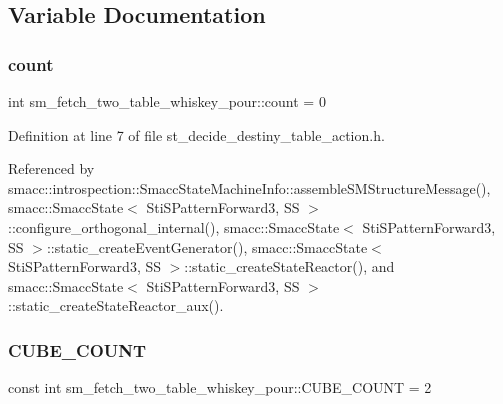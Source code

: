 \subsection{Variable Documentation}
\mbox{\label{namespacesm__fetch__two__table__whiskey__pour_acbce06cd0c9048e8be6a258e2c406986}} 
\subsubsection{\texorpdfstring{count}{count}}
{\footnotesize\ttfamily int sm\+\_\+fetch\+\_\+two\+\_\+table\+\_\+whiskey\+\_\+pour\+::count = 0\hspace{0.3cm}{\ttfamily [static]}}



Definition at line 7 of file st\+\_\+decide\+\_\+destiny\+\_\+table\+\_\+action.\+h.



Referenced by smacc\+::introspection\+::\+Smacc\+State\+Machine\+Info\+::assemble\+S\+M\+Structure\+Message(), smacc\+::\+Smacc\+State$<$ Sti\+S\+Pattern\+Forward3, S\+S $>$\+::configure\+\_\+orthogonal\+\_\+internal(), smacc\+::\+Smacc\+State$<$ Sti\+S\+Pattern\+Forward3, S\+S $>$\+::static\+\_\+create\+Event\+Generator(), smacc\+::\+Smacc\+State$<$ Sti\+S\+Pattern\+Forward3, S\+S $>$\+::static\+\_\+create\+State\+Reactor(), and smacc\+::\+Smacc\+State$<$ Sti\+S\+Pattern\+Forward3, S\+S $>$\+::static\+\_\+create\+State\+Reactor\+\_\+aux().

\mbox{\label{namespacesm__fetch__two__table__whiskey__pour_ab6321f5657e6b4b621a9b084f81bdeb6}} 
\subsubsection{\texorpdfstring{C\+U\+B\+E\+\_\+\+C\+O\+U\+NT}{CUBE\_COUNT}}
{\footnotesize\ttfamily const int sm\+\_\+fetch\+\_\+two\+\_\+table\+\_\+whiskey\+\_\+pour\+::\+C\+U\+B\+E\+\_\+\+C\+O\+U\+NT = 2}



